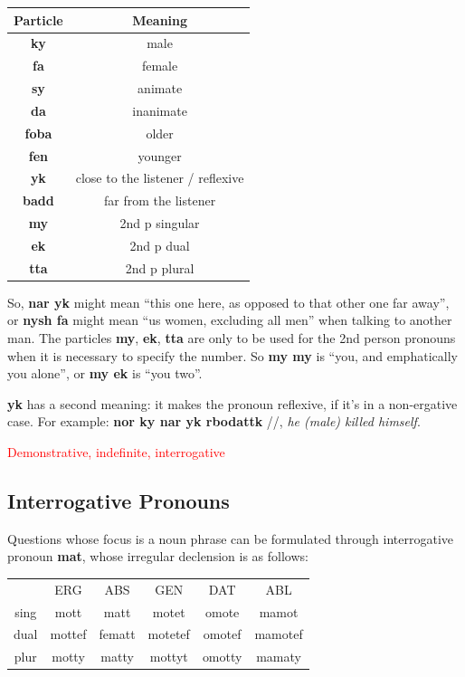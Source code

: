 \documentclass[10pt,oneside]{memoir}
\newcommand{\cmmnt}[1]{\textcolor{red}{#1}}
\newcommand{\ipa}[1]{/\textipa{#1}/}
\begin{document}
\begin{center}
    \begin{tabular}[]{>{\bfseries}c | c}
        Particle & Meaning\\
        \hline
        ky & male\\
        fa & female\\
        sy & animate\\
        da & inanimate\\
        foba & older\\
        fen & younger\\
        yk & close to the listener / reflexive\\
        badd & far from the listener\\
        \hline
        my & 2nd p singular\\
        ek & 2nd p dual\\
        tta & 2nd p plural

    \end{tabular}
\end{center}

So, \textbf{nar yk} might mean ``this one here, as opposed to that other one far away'', or \textbf{nysh fa} might mean ``us women, excluding all men'' when talking to another man. The particles \textbf{my}, \textbf{ek}, \textbf{tta} are only to be used for the 2nd person pronouns when it is necessary to specify the number. So \textbf{my my} is ``you, and emphatically you alone'', or \textbf{my ek} is ``you two''.

\textbf{yk} has a second meaning: it makes the pronoun reflexive, if it's in a non-ergative case. For example: \textbf{nor ky nar yk rbodattk} \ipa{nOr k1 nar 1k rbo"dat:k}, \emph{he (male) killed himself}.

\cmmnt{Demonstrative, indefinite, interrogative}

\subsection{Interrogative Pronouns}

Questions whose focus is a noun phrase can be formulated through interrogative pronoun \textbf{mat}, whose irregular declension is as follows:

\begin{center}
\begin{tabular}[]{*{6}{c}}
 &    ERG & ABS & GEN & DAT & ABL\\
sing &    mott & matt & motet & omote & mamot\\
dual & mottef & fematt & motetef & omotef & mamotef\\
plur & motty & matty & mottyt & omotty & mamaty\\
\end{tabular}
\end{center}
\end{document}

